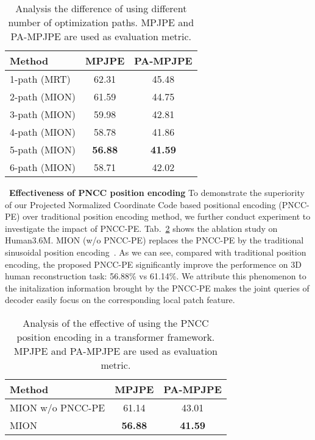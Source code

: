 \documentclass[sigconf]{acmart}
\begin{document}
\begin{table}[t]
	\centering
	
	\begin{tabular}{lcc}
		\toprule
		Method   & MPJPE & PA-MPJPE \\
		\midrule
		1-path (MRT) & 62.31 & 45.48  \\
		2-path (MION)& 61.59 & 44.75 \\
		3-path (MION)& 59.98 & 42.81 \\
		4-path (MION)& 58.78 & 41.86 \\
		5-path (MION)& \textbf{56.88} & \textbf{41.59} \\
		6-path (MION)& 58.71 & 42.02 \\
		\bottomrule
	\end{tabular}
	\vspace{1em}
	\caption{Analysis the difference of using different number of optimization paths. 
		MPJPE and PA-MPJPE are used as evaluation metric.}
	\label{table_path_number}
\end{table}


~\textbf{Effectiveness of PNCC position encoding} 
To demonstrate the superiority of our Projected Normalized Coordinate 
Code based positional encoding (PNCC-PE) over traditional position encoding method, 
we further conduct experiment to investigate the impact of PNCC-PE. 
Tab.~\ref{table_pe} shows the ablation study on Human3.6M. 
MION (w/o PNCC-PE) replaces the PNCC-PE by the traditional sinusoidal position encoding~\cite{vaswani2017attention}. 
As we can see, compared with traditional position encoding, the proposed PNCC-PE significantly improve the 
performence on 3D human reconstruction task: 56.88\% vs 61.14\%. We attribute this phenomenon to the 
initalization information brought by the PNCC-PE makes the joint queries of decoder easily focus on the 
corresponding local patch feature. 

\begin{table}[t]
	\centering
	
	\begin{tabular}{lcc}
		\toprule
		Method   & MPJPE & PA-MPJPE \\
		\midrule
		MION w/o PNCC-PE & 61.14 & 43.01  \\
		MION  & \textbf{56.88} & \textbf{41.59} \\
		\bottomrule
	\end{tabular}
	\vspace{1em}
	\caption{Analysis of the effective of using the PNCC position encoding 
		in a transformer framework. MPJPE and PA-MPJPE are used as evaluation metric.}
	\label{table_pe}
\end{table}
\end{document}
